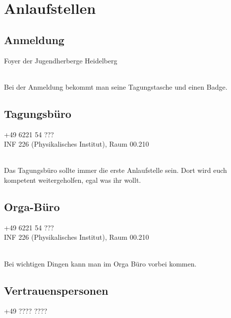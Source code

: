 
\section{Anlaufstellen}

\subsection{Anmeldung}
\faMapPin \quad Foyer der Jugendherberge Heidelberg\\
\faClockO \quad \\ 

\noindent Bei der Anmeldung bekommt man seine Tagungstasche und einen Badge.

\subsection{Tagungsbüro}
\faPhone \quad +49 6221 54 ???\\ 
\faMapPin \quad INF 226 (Physikalisches Institut), Raum 00.210\\
\faClockO \quad \\ 

\noindent Das Tagungsbüro sollte immer die erste Anlaufstelle sein. Dort wird euch kompetent weitergeholfen, egal was ihr wollt.

\subsection{Orga-Büro}
\faPhone \quad +49 6221 54 ???\\ 
\faMapPin \quad INF 226 (Physikalisches Institut), Raum 00.210\\
\faClockO \quad \\ 

\noindent Bei wichtigen Dingen kann man im Orga Büro vorbei kommen.

\subsection{Vertrauenspersonen}
\faPhone \quad +49 ???? ????\\ 
\faUsers \quad \\ 

\noindent {}




